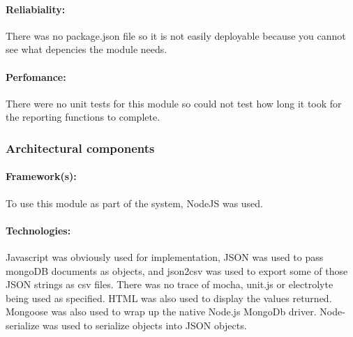 \paragraph{Reliabiality:}
There was no package.json file so it is not easily deployable because you cannot see what depencies the module needs. 
\par
\paragraph{Perfomance:}
There were no unit tests for this module so could not test how long it took for the reporting functions to complete. 
\par


\subsubsection{Architectural components}
\paragraph {Framework(s):}
 To use this module as part of the system, NodeJS was used.
\par
\paragraph{Technologies:}
 Javascript was obviously used for implementation, JSON was used to pass mongoDB documents as objects, and json2csv was used to export some of those JSON strings as csv files. There was no trace of mocha, unit.js or electrolyte being used as specified. HTML was also used to display the values returned. Mongoose was also used to wrap up the native Node.js MongoDb driver. Node-serialize was used to serialize objects into JSON objects.
\par

